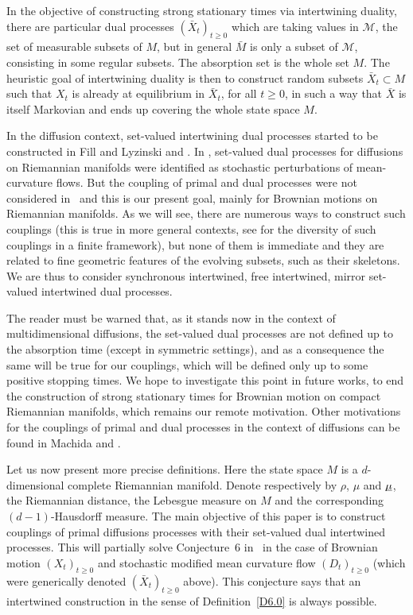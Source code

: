 \documentclass[JEP,XML,SOM,Unicode,NoFloatCountersInSection,published]{cedram}
\theoremstyle{plain}
\theoremstyle{definition}
\newcommand{\usm}{{\underline{\smash{\mu}}}}
\newcommand{\cM}{\mathcal{M}}
\begin{document}
In the objective of constructing strong stationary times via intertwining duality, there are particular dual processes $(\bar X_t)_{t\geq 0}$ which are taking values in $\cM$, the set of measurable subsets of $M$, but in general $\bar M$ is only a subset of $\cM$, consisting in some regular subsets.
The absorption set is the whole set $M$. The heuristic goal of intertwining duality is then to construct random subsets $\bar X_t\subset M$ such that $X_t$ is already at equilibrium in $\bar X_t$, for all $t\geq 0$, in such a way that $\bar X$ is itself Markovian and ends up covering the whole state space $M$.
\par
In the diffusion context, set-valued intertwining dual processes started to be constructed in Fill and Lyzinski \cite{MR3571247} and \cite{MR3634282}.
In \cite{zbMATH07470497}, set-valued dual processes for diffusions on Riemannian manifolds were identified as stochastic perturbations of mean-curvature flows.
But the coupling of primal and dual processes were not considered in~\cite{zbMATH07470497} and this is our present goal, mainly for Brownian motions on Riemannian manifolds.
As we will see, there are numerous ways to construct such couplings (this is true in more general contexts, see \cite{Mic2020} for the diversity of such couplings in a finite framework), but none of them is immediate and they are related to fine geometric features of the evolving subsets, such as their skeletons.
We are thus to consider synchronous intertwined, free intertwined, mirror set-valued intertwined dual processes. \par
The reader must be warned that, as it stands now in the context of multidimensional diffusions, the set-valued dual processes are not defined up to the absorption time (except in symmetric settings), and as a consequence the same will be true for our couplings, which will be defined only up to some positive stopping times.
We hope to investigate this point in future works, to end the construction of strong stationary times for Brownian motion on compact Riemannian manifolds, which remains our remote motivation. Other motivations for the couplings of primal and dual processes in the context of diffusions can be found in Machida \cite{2019arXiv190807559M} and \cite{Mic2020}.

Let us now present more precise definitions. Here the state space $M$ is a $d$\nobreakdash-di\-men\-sional complete Riemannian manifold. Denote respectively by $\rho$, $\mu$ and $\usm$, the Riemannian distance, the Lebesgue measure on $M$ and the corresponding $(d-1)$-Hausdorff measure. The main objective of this paper is to construct couplings of primal diffusions processes with their set-valued dual intertwined processes. This will partially solve Conjecture~6 in~\cite{zbMATH07470497} in the case of Brownian motion $(X_t)_{t\ge 0}$ and stochastic modified mean curvature flow $(D_t)_{t\ge 0}$ (which were generically denoted $(\bar X_t)_{t\ge 0}$ above). This conjecture says that an intertwined construction in the sense of Definition~\ref{D6.0} is always possible.
\end{document}
